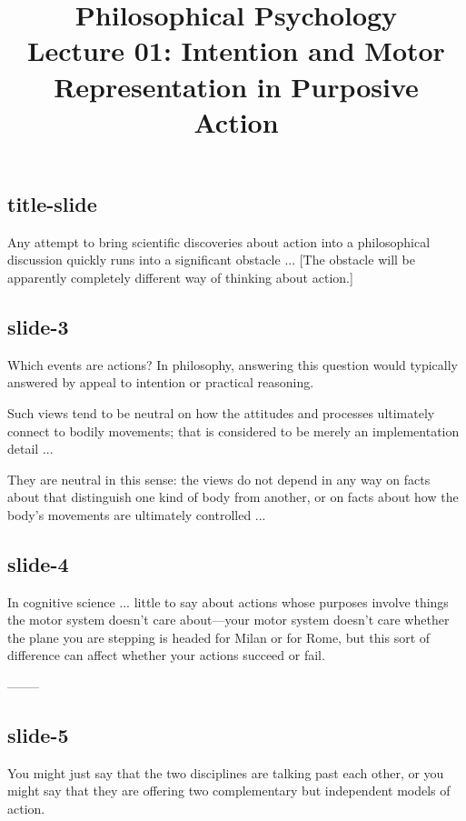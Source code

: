 \documentclass[12pt,\papersize]{extarticle}
\begin{document}
\setlength\footnotesep{1em}






\title {Philosophical Psychology \\ Lecture 01: Intention and Motor Representation in Purposive Action}
 
 
 
\maketitle
 
\subsection{title-slide}
Any attempt to bring scientific discoveries about action into a philosophical
discussion quickly runs into a significant obstacle ...
[The obstacle will be apparently completely different way of thinking about action.]
 
\subsection{slide-3}
Which events are actions?
In philosophy, answering this question would typically answered by appeal to intention
or practical reasoning.
 
Such views tend to be neutral on how
the attitudes and processes ultimately connect to bodily movements;
that is considered to be merely an implementation detail ...
 
They are neutral in this sense: the views do not depend in any way on facts about that
distinguish one kind of body from another, or on facts about how the body’s movements
are ultimately controlled ...
 
\subsection{slide-4}
In cognitive science ... little to say about actions whose purposes
involve things the motor system doesn’t care about---your motor system
doesn’t care whether the plane you are stepping is headed for Milan or
for Rome, but this sort of difference can affect whether your actions succeed or fail.
 
--------
\subsection{slide-5}
You might just say that the two disciplines are talking past each other,
or you might say that they are offering two complementary but independent
models of action.
 
\end{document}
